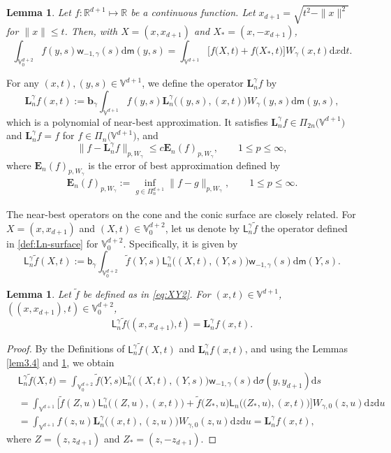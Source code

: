 \documentclass{amsart}
\newtheorem{lem}[thm]{Lemma}
\theoremstyle{remark}
\def\d{\mathrm{d}}
\def\g{{\gamma}}
\def\bb{{\mathbf b}}
\def\Eb{{\mathbf E}}
\def\Lb{{\mathbf L}}
\def\RR{{\mathbb R}}
\def\VV{{\mathbb V}}
\def\d{\mathrm{d}}
\def\sL{{\mathsf L}}
\def\sb{{\mathsf b}}
\def\sm{{\mathsf m}}
\def\sw{{\mathsf w}}
\def\g{{\gamma}}
\def\bb{{\mathbf b}}
\def\Eb{{\mathbf E}}
\def\Lb{{\mathbf L}}
\def\RR{{\mathbb R}}
\def\VV{{\mathbb V}}
\begin{document}
\begin{lem}\label{prop:IntV0V}
Let $f: \RR^{d+1} \mapsto \RR$ be a continuous function. Let $x_{d+1} = \sqrt{t^2-\|x\|^2}$ for $\|x\| \le t$.
Then, with $X= (x,x_{d+1})$ and $X_* = (x,-x_{d+1})$, 
$$
	\int_{\VV_0^{d+2}} f(y,s) \sw_{-1,\g}(s) \d \sm(y,s) = \int_{\VV^{d+1}} 
	\big [ f\big(X,t\big) +  f\big(X_* ,t\big)\big ] W_{\g}(x,t) \d x\d t.
$$
\end{lem}

For any $(x,t),(y,s)\in\VV^{d+1}$, we define  the   operator $\Lb_n^\g f $ by
\begin{equation}\label{nearbest3}
	\Lb_n^\g f (x,t) :=  \bb_\g \int_{\VV^{d+1}}f(y,s)\Lb_{n}^\g \big((y,s),(x,t)\big) W_{\g}(y,s)  \d \sm(y,s),
\end{equation} 
which is a polynomial of near-best approximation. It satisfies $\Lb_n^\g f  \in  \Pi_{2n}\big(\VV^{d+1}\big)$ and 
$\Lb_n^\g f  = f $ for $f \in \Pi_n\big(\VV ^{d+1}\big)$, and 
$$
 \|f- \Lb_n^\g f  \|_{p,W_{\g}} \le c \Eb_n(f)_{p,W_{\g}}, \qquad 1 \le p \le \infty,
$$
where $\Eb_n(f)_{p,W_{\g}}$ is  the error of best approximation defined by 
\begin{align}\label{conebestapprox}
	\Eb_n(f)_{p, W_\g}:= \inf_{g \in \Pi_n^{d+1}} \|f - g\|_{p, W_\g}, \qquad 1 \le p \le \infty.
\end{align}

The near-best operators on the cone and the conic surface are closely related. For \(X = (x, x_{d+1})\) and 
\((X, t) \in \VV_0^{d+2}\), let us denote by $\sL_n^\g \tilde f$ the operator defined in \eqref{def:Ln-surface} for 
\(\VV_0^{d+2}\). Specifically, it is given by
\begin{equation}\label{nearbest-conicsurface}
	\sL_n^\g \tilde{f}(X,t):=  \sb_\g \int_{\VV_0^{d+2}} \tilde{f}(Y,s) \sL_n^\g \big( (X,t), (Y,s) \big) \sw_{-1,\g}(s) \d \sm(Y,s).
\end{equation}

\begin{lem} \label{operator-connection} 
Let $\tilde f$ be defined as in \eqref{eq:XY2}. For $(x,t)\in\VV^{d+1}$, $( (x,x_{d+1}),t) \in\VV_0^{d+2}$, 
$$
     \sL^\g_n\tilde{f} \big( (x,x_{d+1}\big),t)= \Lb^\g_nf(x,t).
$$ 
\end{lem}

\begin{proof}  
By the Definitions of $\sL^\g_n\tilde{f}(X,t)$ and $\Lb^\g_nf(x,t)$, and using the Lemmas \ref{lem3.4} and \ref{prop:IntV0V}, 
we obtain 
\begin{align*}
& \sL^\g_n \tilde{f} \big( X,t) = \int_{\VV_0^{d+2}} \tilde{f}\big(Y, s\big) \sL_n^\g \big( (X,t), (Y,s)\big)\sw_{-1,\g}(s) \d\sigma(y,y_{d+1}) \d s   \\ & = \int_{\VV^{d+1}} \Big[ \tilde{f}(Z,u) \sL_{n}^\g\big((Z,u),(x,t)\big) + \tilde{f}\big(Z_*,u \big)
 \sL_{n}\big(\big(Z_*,u\big),(x,t)\big) \Big] W_{\g,0}(z,u)\d z \d u\\
  &=  \int_{\VV^{d+1}}f(z,u)\Lb_n^\g\big((x,t), (z,u)\big)W_{\g,0}{(z,u)}\d z \d u =  \Lb^\g_nf(x,t),
\end{align*}
where $Z=(z, z_{d+1})$ and $Z_* = (z,- z_{d+1})$.
\end{proof}
\end{document}
